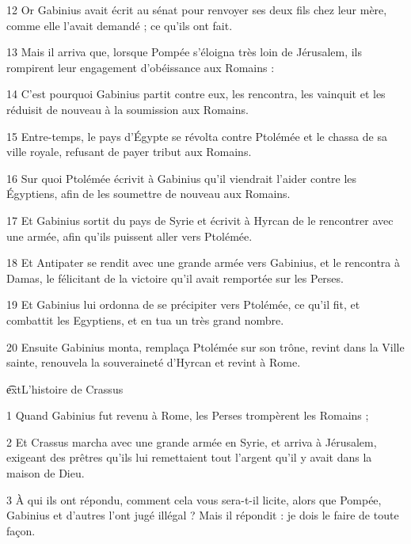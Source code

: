 \par 12 Or Gabinius avait écrit au sénat pour renvoyer ses deux fils chez leur mère, comme elle l'avait demandé ; ce qu'ils ont fait.

\par 13 Mais il arriva que, lorsque Pompée s'éloigna très loin de Jérusalem, ils rompirent leur engagement d'obéissance aux Romains :

\par 14 C'est pourquoi Gabinius partit contre eux, les rencontra, les vainquit et les réduisit de nouveau à la soumission aux Romains.

\par 15 Entre-temps, le pays d'Égypte se révolta contre Ptolémée et le chassa de sa ville royale, refusant de payer tribut aux Romains.

\par 16 Sur quoi Ptolémée écrivit à Gabinius qu'il viendrait l'aider contre les Égyptiens, afin de les soumettre de nouveau aux Romains.

\par 17 Et Gabinius sortit du pays de Syrie et écrivit à Hyrcan de le rencontrer avec une armée, afin qu'ils puissent aller vers Ptolémée.

\par 18 Et Antipater se rendit avec une grande armée vers Gabinius, et le rencontra à Damas, le félicitant de la victoire qu'il avait remportée sur les Perses.

\par 19 Et Gabinius lui ordonna de se précipiter vers Ptolémée, ce qu'il fit, et combattit les Egyptiens, et en tua un très grand nombre.

\par 20 Ensuite Gabinius monta, remplaça Ptolémée sur son trône, revint dans la Ville sainte, renouvela la souveraineté d'Hyrcan et revint à Rome.



\par \t ext{L'histoire de Crassus}

\par 1 Quand Gabinius fut revenu à Rome, les Perses trompèrent les Romains ;

\par 2 Et Crassus marcha avec une grande armée en Syrie, et arriva à Jérusalem, exigeant des prêtres qu'ils lui remettaient tout l'argent qu'il y avait dans la maison de Dieu.

\par 3 À qui ils ont répondu, comment cela vous sera-t-il licite, alors que Pompée, Gabinius et d'autres l'ont jugé illégal ? Mais il répondit : je dois le faire de toute façon.

